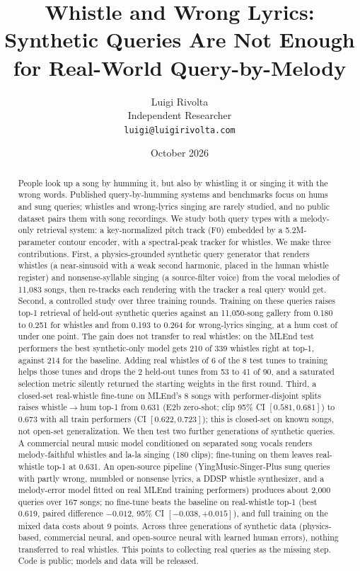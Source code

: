 \documentclass[11pt]{article}
\title{Whistle and Wrong Lyrics: Synthetic Queries Are Not Enough\\for Real-World Query-by-Melody}
\author{Luigi Rivolta\\Independent Researcher\\\texttt{luigi@luigirivolta.com}}
\date{October 2026}
\begin{document}
\maketitle

\begin{abstract}
People look up a song by humming it, but also by whistling it or singing it with the wrong words. Published query-by-humming systems and benchmarks focus on hums and sung queries; whistles and wrong-lyrics singing are rarely studied, and no public dataset pairs them with song recordings. We study both query types with a melody-only retrieval system: a key-normalized pitch track (F0) embedded by a 5.2M-parameter contour encoder, with a spectral-peak tracker for whistles. We make three contributions. First, a physics-grounded synthetic query generator that renders whistles (a near-sinusoid with a weak second harmonic, placed in the human whistle register) and nonsense-syllable singing (a source-filter voice) from the vocal melodies of 11,083 songs, then re-tracks each rendering with the tracker a real query would get. Second, a controlled study over three training rounds. Training on these queries raises top-1 retrieval of held-out synthetic queries against an 11,050-song gallery from 0.180 to 0.251 for whistles and from 0.193 to 0.264 for wrong-lyrics singing, at a hum cost of under one point. The gain does not transfer to real whistles: on the MLEnd test performers the best synthetic-only model gets 210 of 339 whistles right at top-1, against 214 for the baseline. Adding real whistles of 6 of the 8 test tunes to training helps those tunes and drops the 2 held-out tunes from 53 to 41 of 90, and a saturated selection metric silently returned the starting weights in the first round. Third, a closed-set real-whistle fine-tune on MLEnd's 8 songs with performer-disjoint splits raises whistle$\to$hum top-1 from 0.631 (E2b zero-shot; clip 95\% CI $[0.581, 0.681]$) to 0.673 with all train performers (CI $[0.622, 0.723]$); this is closed-set on known songs, not open-set generalization. We then test two further generations of synthetic queries. A commercial neural music model conditioned on separated song vocals renders melody-faithful whistles and la-la singing (180 clips); fine-tuning on them leaves real-whistle top-1 at 0.631. An open-source pipeline (YingMusic-Singer-Plus sung queries with partly wrong, mumbled or nonsense lyrics, a DDSP whistle synthesizer, and a melody-error model fitted on real MLEnd training performers) produces about 2,000 queries over 167 songs; no fine-tune beats the baseline on real-whistle top-1 (best 0.619, paired difference $-0.012$, 95\% CI $[-0.038, +0.015]$), and full training on the mixed data costs about 9 points. Across three generations of synthetic data (physics-based, commercial neural, and open-source neural with learned human errors), nothing transferred to real whistles. This points to collecting real queries as the missing step. Code is public; models and data will be released.
\end{abstract}
\end{document}
